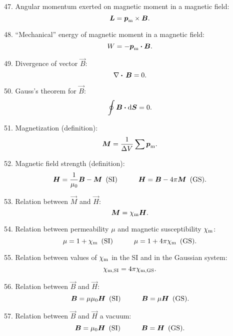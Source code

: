 47. Angular momentum exerted on magnetic moment in a magnetic field:
\begin{equation*}
	\boldsymbol{L} = \boldsymbol{p}_{\text{m}} \times \boldsymbol{B}.
\end{equation*}

48. ``Mechanical'' energy of magnetic moment in a magnetic field:
\begin{equation*}
	W = -\boldsymbol{p}_{\text{m}}\boldsymbol{\cdot}\boldsymbol{B}.
\end{equation*}

49. Divergence of vector $\vec{B}$:
\begin{equation*}
	\nabla\boldsymbol{\cdot}\,\boldsymbol{B} = 0.
\end{equation*}

50. Gauss's theorem for $\vec{B}$:
\begin{equation*}
	\oint\boldsymbol{B}\boldsymbol{\cdot}\mathrm{d}\boldsymbol{S} = 0.
\end{equation*}

51. Magnetization (definition):
\begin{equation*}
	\boldsymbol{M} = \frac{1}{\Delta{V}} \sum\boldsymbol{p}_{\text{m}}.
\end{equation*}

52. Magnetic field strength (definition):
\begin{equation*}
	\boldsymbol{H}=\frac{1}{\mu_0} \boldsymbol{B} - \boldsymbol{M} \,\,\,\text{(SI)}\quad\quad\quad \boldsymbol{H}=\boldsymbol{B} - 4\pi\boldsymbol{M} \,\,\,\text{(GS)}.
\end{equation*}

53. Relation between $\vec{M}$ and $\vec{H}$:
\begin{equation*}
	\boldsymbol{M} = \chi_{\text{m}} \boldsymbol{H}.
\end{equation*}

54. Relation between permeability $\mu$ and magnetic susceptibility $\chi_{\text{m}}$:
\begin{equation*}
	\mu=1+\chi_{\text{m}} \,\,\,\text{(SI)}\quad\quad\quad \mu=1+4\pi\chi_{\text{m}} \,\,\,\text{(GS)}.
\end{equation*}

55. Relation between values of $\chi_{\text{m}}$ in the SI and in the Gaussian system:
\begin{equation*}
	\chi_{\text{m,SI}} = 4\pi\chi_{\text{m,GS}}.
\end{equation*}

56. Relation between $\vec{B}$ and $\vec{H}$:
\begin{equation*}
	\boldsymbol{B}=\mu\mu_0\boldsymbol{H} \,\,\,\text{(SI)}\quad\quad\quad \boldsymbol{B}=\mu\boldsymbol{H} \,\,\,\text{(GS)}.
\end{equation*}

57. Relation between $\vec{B}$ and $\vec{H}$ a vacuum:
\begin{equation*}
	\boldsymbol{B}=\mu_0\boldsymbol{H} \,\,\,\text{(SI)}\quad\quad\quad \boldsymbol{B}=\boldsymbol{H} \,\,\,\text{(GS)}.
\end{equation*}

